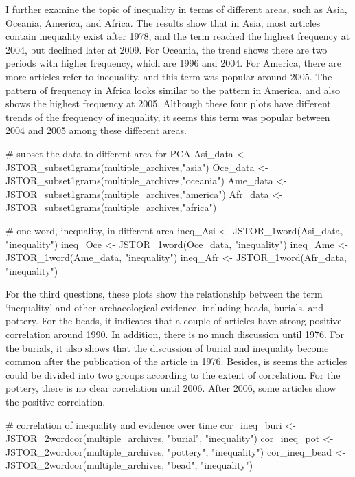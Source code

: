 \documentclass[10pt]{article}
\newenvironment{CodeChunk}{}{}
\begin{document}
\begin{CodeChunk}
I further examine the topic of inequality in terms of different areas,
such as Asia, Oceania, America, and Africa. The results show that in
Asia, most articles contain inequality exist after 1978, and the term
reached the highest frequency at 2004, but declined later at 2009. For
Oceania, the trend shows there are two periods with higher frequency,
which are 1996 and 2004. For America, there are more articles refer to
inequality, and this term was popular around 2005. The pattern of
frequency in Africa looks similar to the pattern in America, and also
shows the highest frequency at 2005. Although these four plots have
different trends of the frequency of inequality, it seems this term was
popular between 2004 and 2005 among these different areas.

\begin{CodeChunk}
\begin{CodeInput}
# subset the data to different area for PCA
Asi_data <- JSTOR_subset1grams(multiple_archives,"asia")
Oce_data <- JSTOR_subset1grams(multiple_archives,"oceania")
Ame_data <- JSTOR_subset1grams(multiple_archives,"america")
Afr_data <- JSTOR_subset1grams(multiple_archives,"africa")
\end{CodeInput}
\end{CodeChunk}

\begin{CodeChunk}
\begin{CodeInput}
# one word, inequality, in different area
ineq_Asi <- JSTOR_1word(Asi_data, "inequality")
ineq_Oce <- JSTOR_1word(Oce_data, "inequality")
ineq_Ame <- JSTOR_1word(Ame_data, "inequality")
ineq_Afr <- JSTOR_1word(Afr_data, "inequality")
\end{CodeInput}
\end{CodeChunk}

For the third questions, these plots show the relationship between the
term `inequality' and other archaeological evidence, including beads,
burials, and pottery. For the beads, it indicates that a couple of
articles have strong positive correlation around 1990. In addition,
there is no much discussion until 1976. For the burials, it also shows
that the discussion of burial and inequality become common after the
publication of the article in 1976. Besides, is seems the articles could
be divided into two groups according to the extent of correlation. For
the pottery, there is no clear correlation until 2006. After 2006, some
articles show the positive correlation.

\begin{CodeChunk}
\begin{CodeInput}
# correlation of inequality and evidence over time
cor_ineq_buri <- JSTOR_2wordcor(multiple_archives, "burial", "inequality")
cor_ineq_pot <- JSTOR_2wordcor(multiple_archives, "pottery", "inequality")
cor_ineq_bead <- JSTOR_2wordcor(multiple_archives, "bead", "inequality")
\end{CodeInput}
\end{CodeChunk}


\end{CodeChunk}
\end{document}

